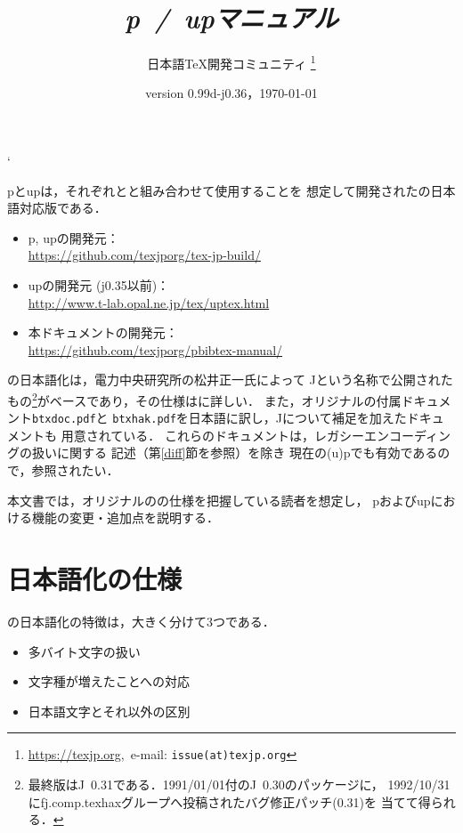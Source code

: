 \documentclass[a4paper,11pt,nomag,dvipdfmx]{jsarticle}
\def\file#1{\texttt{#1}}
\def\JBibTeX{\leavevmode\textcompwordmark\lower.5ex\hbox{J}\kern-.08em\BibTeX}
\def\pBibTeX{p\kern-.05em\BibTeX}
\def\upBibTeX{u\pBibTeX}
\def\JBibTeX{J\BibTeX}%
\def\pBibTeX{p\BibTeX}%
\def\upBibTeX{u\pBibTeX}%
\begin{document}
\catcode`
\title{\emph{\pBibTeX~/~\upBibTeX マニュアル}}
\author{日本語\TeX 開発コミュニティ\null
\thanks{\url{https://texjp.org},\ e-mail: \texttt{issue(at)texjp.org}}}
\date{version 0.99d-j0.36，\today}
\maketitle

\pBibTeX と\upBibTeX は，それぞれ\pTeX と\upTeX と組み合わせて使用することを
想定して開発された\BibTeX の日本語対応版である．
\begin{itemize}
  \item \pBibTeX, \upBibTeX の開発元：\\
    \url{https://github.com/texjporg/tex-jp-build/}
  \item \upBibTeX の開発元 (j0.35以前)：\\
    \url{http://www.t-lab.opal.ne.jp/tex/uptex.html}
  \item 本ドキュメントの開発元：\\
    \url{https://github.com/texjporg/pbibtex-manual/}
\end{itemize}

\BibTeX の日本語化は，電力中央研究所の松井正一氏によって
\JBibTeX という名称で公開されたもの\footnote{%
最終版は\JBibTeX~0.31である．1991/01/01付の\JBibTeX~0.30のパッケージに，
1992/10/31にfj.comp.texhaxグループへ投稿されたバグ修正パッチ(0.31)を
当てて得られる．}がベースであり，その仕様は\cite{jbibtex}に詳しい．
また，オリジナルの\BibTeX 付属ドキュメント\file{btxdoc.pdf}と
\file{btxhak.pdf}を日本語に訳し，\JBibTeX について補足を加えたドキュメントも
用意されている\cite{jbtxdoc,jbtxhak}．
これらのドキュメントは，レガシーエンコーディングの扱いに関する
記述（第\ref{diff}節を参照）を除き
現在の(u)\pBibTeX でも有効であるので，参照されたい．

本文書では，オリジナルの\BibTeX の仕様を把握している読者を想定し，
\pBibTeX および\upBibTeX における機能の変更・追加点を説明する．

\clearpage
\tableofcontents
\clearpage

\section{日本語化の仕様}

\BibTeX の日本語化の特徴は，大きく分けて3つである．
\begin{itemize}
 \item 多バイト文字の扱い
 \item 文字種が増えたことへの対応
 \item 日本語文字とそれ以外の区別
\end{itemize}
\end{document}
